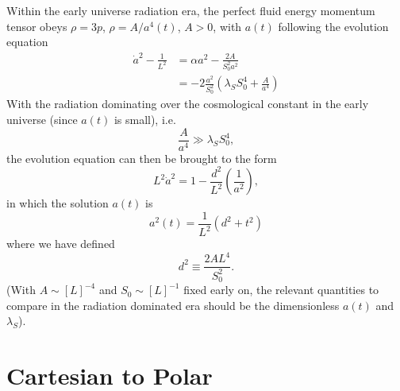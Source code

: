 \documentclass[10pt,letterpaper]{article}
\begin{document}
\\ \\
Within the early universe radiation era,  the perfect fluid energy momentum tensor obeys $\rho = 3p$, $\rho = A/a^4(t)$, $A>0$, with $a(t)$ following the evolution equation
\begin{align}
 \dot a^2 - \frac{1}{L^2}&= \alpha a^2 - \frac{2A}{S_0^2a^2}\nonumber\\
&= -2\frac{a^2}{S_0^2} \left( \lambda_S S_0^4 + \frac{A}{a^4}\right) 
\end{align}
With the radiation dominating over the cosmological constant in the early universe (since $a(t)$ is small), i.e.
\begin{equation}
\frac{A}{a^4} \gg \lambda_S S_0^4,
\end{equation}
the evolution equation can then be brought to the form
\begin{equation}
L^2 \dot a^2 = 1- \frac{d^2}{L^2} \left(\frac{1}{a^2}\right),
\end{equation}
in which the solution $a(t)$ is
\begin{equation}
a^2(t) = \frac{1}{L^2}(d^2+t^2)
\end{equation}
where we have defined
\begin{equation}
d^2 \equiv \frac{2AL^4}{S_0^2}.
\end{equation}
(With $A \sim [L]^{-4}$ and $S_0 \sim [L]^{-1}$ fixed early on, the relevant quantities to compare in the radiation dominated era should be the dimensionless $a(t)$ and $\lambda_S$). 
\section*{Cartesian to Polar}
\end{document}
